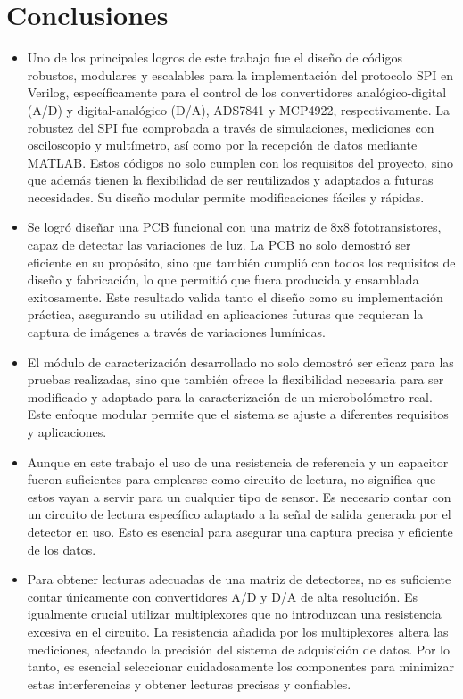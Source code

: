 \chapter{Conclusiones}

\begin{itemize}
 \item Uno de los principales logros de este trabajo fue el diseño de códigos robustos, modulares y escalables para la implementación del protocolo SPI en Verilog, específicamente para el control de los convertidores analógico-digital (A/D) y digital-analógico (D/A), ADS7841 y MCP4922, respectivamente. La robustez del SPI fue comprobada a través de simulaciones, mediciones con osciloscopio y multímetro, así como por la recepción de datos mediante MATLAB. Estos códigos no solo cumplen con los requisitos del proyecto, sino que además tienen la flexibilidad de ser reutilizados y adaptados a futuras necesidades. Su diseño modular permite modificaciones fáciles y rápidas.
 \item Se logró diseñar una PCB funcional con una matriz de 8x8 fototransistores, capaz de detectar las variaciones de luz. La PCB no solo demostró ser eficiente en su propósito, sino que también cumplió con todos los requisitos de diseño y fabricación, lo que permitió que fuera producida y ensamblada exitosamente. Este resultado valida tanto el diseño como su implementación práctica, asegurando su utilidad en aplicaciones futuras que requieran la captura de imágenes a través de variaciones lumínicas.  
 \item El módulo de caracterización desarrollado no solo demostró ser eficaz para las pruebas realizadas, sino que también ofrece la flexibilidad necesaria para ser modificado y adaptado para la caracterización de un microbolómetro real. Este enfoque modular permite que el sistema se ajuste a diferentes requisitos y aplicaciones.
 \item Aunque en este trabajo el uso de una resistencia de referencia y un capacitor fueron suficientes para emplearse como circuito de lectura, no significa que estos vayan a servir para un cualquier tipo de sensor. Es necesario contar con un circuito de lectura específico adaptado a la señal de salida generada por el detector en uso. Esto es esencial para asegurar una captura precisa y eficiente de los datos.
 \item Para obtener lecturas adecuadas de una matriz de detectores, no es suficiente contar únicamente con convertidores A/D y D/A de alta resolución. Es igualmente crucial utilizar multiplexores que no introduzcan una resistencia excesiva en el circuito. La resistencia añadida por los multiplexores altera las mediciones, afectando la precisión del sistema de adquisición de datos. Por lo tanto, es esencial seleccionar cuidadosamente los componentes para minimizar estas interferencias y obtener lecturas precisas y confiables.
\end{itemize}


    
